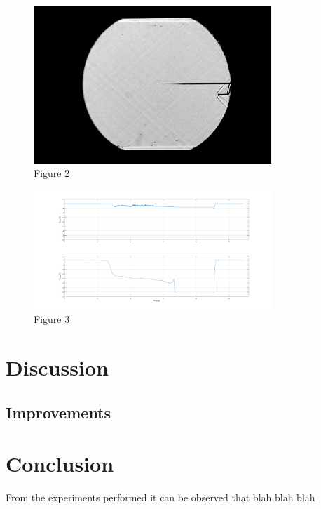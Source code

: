 \documentclass[8pt]{article}
\begin{document}
\begin{figure}[H]
    \centering
    \includegraphics[width=0.8\textwidth]{working_state.jpg}
    \caption{Figure 2}
    \label{fig:figure7}
\end{figure}

\newpage

\begin{figure}[H]
    \centering
    \includegraphics[width=0.8\textwidth]{tunnel_pressures.png}
    \caption{Figure 3}
    \label{fig:figure8}
\end{figure}

\newpage

\section{Discussion}


\subsection{Improvements}

\section{Conclusion}

From the experiments performed it can be observed that blah blah blah
\end{document}
